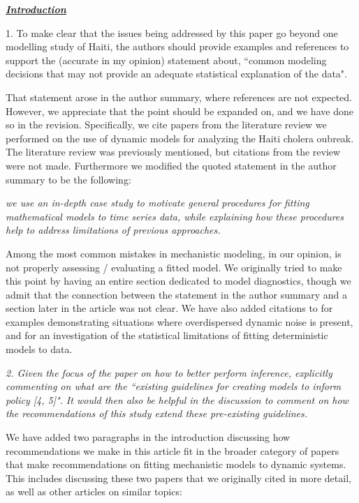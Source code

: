 \documentclass[11pt]{article}
\newcommand\report[1]{{\color{mygreen} \vspace{1mm}\hspace{0.25in}\parbox{6in}{\em #1}}}
\newcommand\article[1]{{\color{blue} \vspace{1mm}\hspace{0.25in}\parbox{6in}{\em #1}}}
\begin{document}
\report{
  \textbf{\underline{Introduction}}

1.  To make clear that the issues being addressed by this paper go beyond one modelling study of Haiti, the authors should provide examples and references to support the (accurate in my opinion) statement about, ``common modeling decisions that may not provide an adequate statistical explanation of the data".
}

That statement arose in the author summary, where references are not expected.
However, we appreciate that the point should be expanded on, and we have done so in the revision. Specifically, we cite papers from the literature review we performed on the use of dynamic models for analyzing the Haiti cholera oubreak. The literature review was previously mentioned, but citations from the review were not made. Furthermore we modified the quoted statement in the author summary to be the following: 

\article{we use an in-depth case study to motivate general procedures for fitting mathematical models to time series data, while explaining how these procedures help to address limitations of previous approaches.}

Among the most common mistakes in mechanistic modeling, in our opinion, is not properly assessing / evaluating a fitted model. 
We originally tried to make this point by having an entire section dedicated to model diagnostics, though we admit that the connection between the statement in the author summary and a section later in the article was not clear. 
We have also added citations to \cite{he10,stocks20}  for examples demonstrating situations where overdispersed dynamic noise is present, and \cite{king15} for an investigation of the statistical limitations of fitting deterministic models to data.


\report{2.
  Given the focus of the paper on how to better perform inference, explicitly commenting on what are the ``existing guidelines for creating models to inform policy [4, 5]". It would then also be helpful in the discussion to comment on how the recommendations of this study extend these pre-existing guidelines.
}

We have added two paragraphs in the introduction discussing how recommendations we make in this article fit in the broader category of papers that make recommendations on fitting mechanistic models to dynamic systems. This includes discussing these two papers that we originally cited in more detail, as well as other articles on similar topics: 
\end{document}
